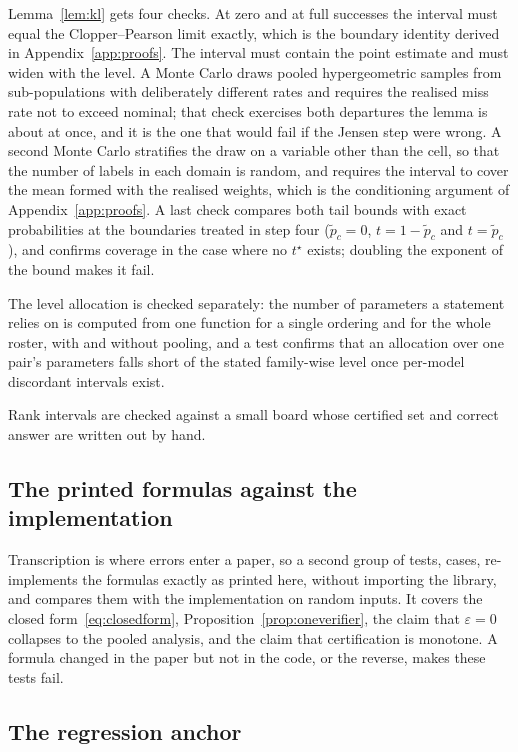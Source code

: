 Lemma~\ref{lem:kl} gets four checks. At zero and at full successes the interval must equal
the Clopper--Pearson limit exactly, which is the boundary identity derived in
Appendix~\ref{app:proofs}. The interval must contain the point estimate and must widen with
the level. A Monte Carlo draws pooled hypergeometric samples from sub-populations with
deliberately different rates and requires the realised miss rate not to exceed nominal; that
check exercises both departures the lemma is about at once, and it is the one that would fail
if the Jensen step were wrong. A second Monte Carlo stratifies the draw on a variable other
than the cell, so that the number of labels in each domain is random, and requires the interval
to cover the mean formed with the realised weights, which is the conditioning argument of
Appendix~\ref{app:proofs}. A last check compares both tail bounds with exact probabilities at the
boundaries treated in step four ($\tilde p_c = 0$, $t = 1 - \tilde p_c$ and $t = \tilde p_c$), and
confirms coverage in the case where no $t^{\star}$ exists; doubling the exponent of the bound makes
it fail.

The level allocation is checked separately: the number of parameters a statement relies on is
computed from one function for a single ordering and for the whole roster, with and without
pooling, and a test confirms that an allocation over one pair's parameters falls short of the
stated family-wise level once per-model discordant intervals exist.

Rank intervals are checked against a small board whose certified set and correct answer are
written out by hand.

\subsection{The printed formulas against the implementation}

Transcription is where errors enter a paper, so a second group of tests,
\TestsManuscriptClaims{} cases, re-implements the formulas exactly as printed here, without
importing the library, and compares them with the implementation on random inputs. It covers
the closed form~\eqref{eq:closedform}, Proposition~\ref{prop:oneverifier}, the claim that
$\varepsilon = 0$ collapses to the pooled analysis, and the claim that certification is
monotone. A formula changed in the paper but not in the code, or the reverse, makes these tests
fail.

\subsection{The regression anchor}

